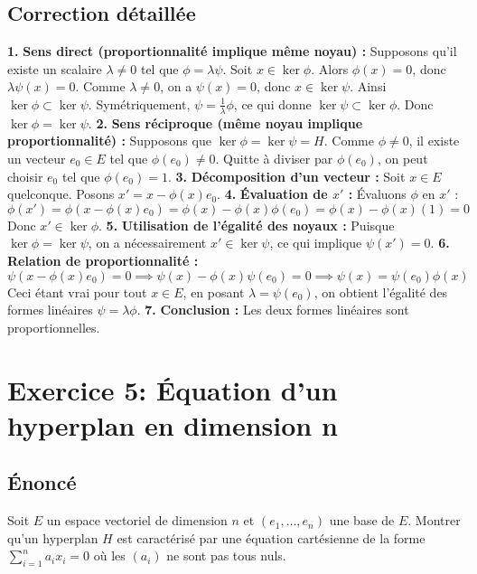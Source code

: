 \documentclass[12pt,a4paper]{report}
\begin{document}
\section{Correction détaillée}
\textbf{1.} \textbf{Sens direct (proportionnalité implique même noyau) :}
   Supposons qu'il existe un scalaire $\lambda \neq 0$ tel que $\phi = \lambda \psi$.
   Soit $x \in \ker \phi$. Alors $\phi(x) = 0$, donc $\lambda \psi(x) = 0$. Comme $\lambda \neq 0$, on a $\psi(x) = 0$, donc $x \in \ker \psi$. Ainsi $\ker \phi \subset \ker \psi$.
   Symétriquement, $\psi = \frac{1}{\lambda} \phi$, ce qui donne $\ker \psi \subset \ker \phi$. Donc $\ker \phi = \ker \psi$.
\textbf{2.} \textbf{Sens réciproque (même noyau implique proportionnalité) :}
   Supposons que $\ker \phi = \ker \psi = H$. Comme $\phi \neq 0$, il existe un vecteur $e_0 \in E$ tel que $\phi(e_0) \neq 0$. Quitte à diviser par $\phi(e_0)$, on peut choisir $e_0$ tel que $\phi(e_0) = 1$.
\textbf{3.} \textbf{Décomposition d'un vecteur :} Soit $x \in E$ quelconque. Posons $x' = x - \phi(x)e_0$.
\textbf{4.} \textbf{Évaluation de $x'$ :} Évaluons $\phi$ en $x'$ :
   $$\phi(x') = \phi(x - \phi(x)e_0) = \phi(x) - \phi(x)\phi(e_0) = \phi(x) - \phi(x)(1) = 0$$
   Donc $x' \in \ker \phi$.
\textbf{5.} \textbf{Utilisation de l'égalité des noyaux :} Puisque $\ker \phi = \ker \psi$, on a nécessairement $x' \in \ker \psi$, ce qui implique $\psi(x') = 0$.
\textbf{6.} \textbf{Relation de proportionnalité :}
   $$\psi(x - \phi(x)e_0) = 0 \implies \psi(x) - \phi(x)\psi(e_0) = 0 \implies \psi(x) = \psi(e_0)\phi(x)$$
   Ceci étant vrai pour tout $x \in E$, en posant $\lambda = \psi(e_0)$, on obtient l'égalité des formes linéaires $\psi = \lambda \phi$.
\textbf{7.} \textbf{Conclusion :} Les deux formes linéaires sont proportionnelles.

\newpage
\chapter{Exercice 5: Équation d'un hyperplan en dimension n}
\section{Énoncé}
Soit $E$ un espace vectoriel de dimension $n$ et $(e_1, \dots, e_n)$ une base de $E$. Montrer qu'un hyperplan $H$ est caractérisé par une équation cartésienne de la forme $\sum_{i=1}^n a_i x_i = 0$ où les $(a_i)$ ne sont pas tous nuls.
\end{document}
